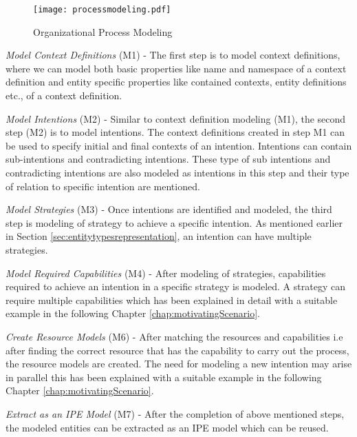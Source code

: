 	\begin{figure}
		\centering
		\texttt{[image: processmodeling.pdf]}
		\caption{Organizational Process Modeling}
		\label{fig:processdiagram}
	\end{figure}

\textit{Model Context Definitions} (M1) -  The first step is to model context definitions, where we can model both basic properties like name and namespace of a context definition and entity specific properties like contained contexts, entity definitions etc., of a context definition.  

\textit{Model Intentions} (M2) -  Similar to context definition modeling (M1), the second step (M2) is to model intentions. The context definitions created in step M1 can be used to specify initial and final contexts of an intention. Intentions can contain sub-intentions and contradicting intentions. These type of sub intentions and contradicting intentions are also modeled as intentions in this step and their type of relation to specific intention are mentioned. 

\textit{Model Strategies} (M3) -  Once intentions are identified and modeled, the third step is modeling of strategy to achieve a specific intention. As mentioned earlier in Section \ref{sec:entitytypesrepresentation}, an intention can have multiple strategies. 

\textit{Model Required Capabilities} (M4) - After modeling of strategies, capabilities required to achieve an intention in a specific strategy is modeled. A strategy can require multiple capabilities which has been explained in detail with a suitable example in the following Chapter \ref{chap:motivatingScenario}. 

\textit{Create Resource Models} (M6) -  After matching the resources and capabilities i.e after finding the correct resource that has the capability to carry out the process, the resource models are created. The need for modeling a new intention may arise in parallel this has been explained with a suitable example in the following Chapter \ref{chap:motivatingScenario}.   

\textit{Extract as an IPE Model} (M7) -  After the completion of above mentioned steps, the modeled entities can be extracted as an IPE model which can be reused. 

